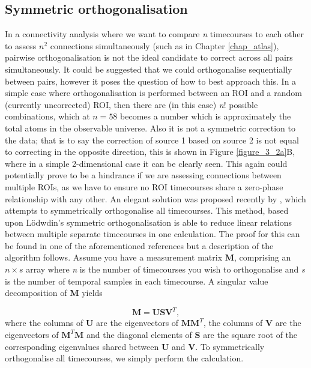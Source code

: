 \subsection{Symmetric orthogonalisation}\label{sec_symm_orth}
In a connectivity analysis where we want to compare \textit{n} timecourses to each other to assess $n^2$ connections simultaneously (such as in Chapter \ref{chap_atlas}), pairwise orthogonalisation is not the ideal candidate to correct across all pairs simultaneously. It could be suggested that we could orthogonalise sequentially between pairs, however it poses the question of how to best approach this. In a simple case where orthogonalisation is performed between an ROI and a random (currently uncorrected) ROI, then there are (in this case) \textit{n}! possible combinations, which at $n=58$ becomes a number which is approximately the total atoms in the observable universe. Also it is not a symmetric correction to the data; that is to say the correction of source 1 based on source 2 is not equal to correcting in the opposite direction, this is shown in Figure \ref{figure_3_2a}B, where in a simple 2-dimensional case it can be clearly seen. This again could potentially prove to be a hindrance if we are assessing connections between multiple ROIs, as we have to ensure no ROI timecourses share a zero-phase relationship with any other. An elegant solution was  proposed recently by \cite{Colclough2015}, which attempts to symmetrically orthogonalise all timecourses. This method, based upon Lödwdin's symmetric orthogonalisation \citep{Lowdin1950,Mayer2002} is able to reduce linear relations between multiple separate timecourses in one calculation. The proof for this can be found in one of the aforementioned references but a description of the algorithm follows. Assume you have a measurement matrix \textbf{M}, comprising an $n \times s$ array where \textit{n} is the number of timecourses you wish to orthogonalise and \textit{s} is the number of temporal samples in each timecourse. A singular value decomposition of \textbf{M} yields

\begin{equation}
\mathbf{M}=\mathbf{USV}^T,
\end{equation} where the columns of \textbf{U} are the eigenvectors of $\mathbf{MM}^T$, the columns of \textbf{V} are the eigenvectors of $\mathbf{M}^T\mathbf{M}$ and the diagonal elements of \textbf{S} are the square root of the corresponding eigenvalues shared between \textbf{U} and \textbf{V}. To symmetrically orthogonalise all timecourses, we simply perform the calculation.

